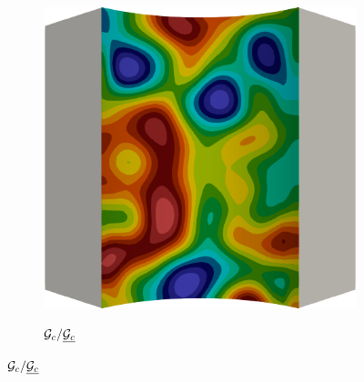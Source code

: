 \begin{frame}
\begin{columns}[T]
\begin{column}{0.6\textwidth}
\begin{figure}
{\begin{subfigure}{0.25\textwidth}
            \centering
            \includegraphics[width=\textwidth]{Chapter345/figures/Gc.0000}
          \end{subfigure}
          \begin{subfigure}{0.1\textwidth}
            \centering
            \caption*{${\mathcal{G}_c}/\underline{{\mathcal{G}_c}}$}

\end{subfigure}}
\end{figure}
\end{column}
\end{columns}
\end{frame}
